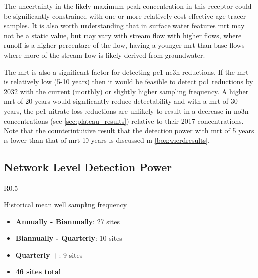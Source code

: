 The uncertainty in the likely maximum peak concentration in this receptor could be significantly constrained with one or more relatively cost-effective age tracer samples.
It is also worth understanding that in surface water features \gls{mrt} may not be a static value, but may vary with stream flow with higher flows, where runoff is a higher percentage of the flow, having a younger \gls{mrt} than base flows where more of the stream flow is likely derived from groundwater.


The \gls{mrt} is also a significant factor for detecting \gls{pc1} \gls{no3n} reductions.
If the \gls{mrt} is relatively low (5-10 years) then it would be feasible to detect \gls{pc1} reductions by 2032 with the current (monthly) or slightly higher sampling frequency.
A higher \gls{mrt} of 20 years would significantly reduce detectability and with a \gls{mrt} of 30 years, the \gls{pc1} nitrate loss reductions are unlikely to result in a decrease in \gls{no3n} concentrations (see \autoref{sec:plateau_results}) relative to their 2017 concentrations.
Note that the counterintuitive result that the detection power with \gls{mrt} of 5 years is lower than that of \gls{mrt} 10 years is discussed in \autoref{box:wierdresults}.


\pagebreak
\subsection[Network Detection Power]{Network Level Detection Power} \label{sec:network_results}


\begin{wrapfigure}{R}{0.5\textwidth}
    \begin{breakawaybox}[label={box:sfreq}]{Historical mean well sampling frequency}
        \begin{itemize}
        \item \textbf{Annually - Biannually}: 27 sites
        \item \textbf{Biannually - Quarterly}: 10 sites
        \item \textbf{Quarterly +}: 9 sites
        \item \textbf{46 sites total}
        \end{itemize}
    \end{breakawaybox}
\end{wrapfigure}

